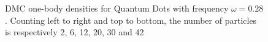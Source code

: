 \begin{figure}
\begin{center}
  \caption{DMC one-body densities for Quantum Dots with frequency $\omega=0.28$. Counting left to right and top to bottom, the number of particles is respectively 2, 6, 12, 20, 30 and 42}
  \label{fig:OBD_DMC_QDOTS_w028}
 \end{center}
\end{figure}


\begin{figure}
 \begin{center}
   \\

\end{center}
\end{figure}
